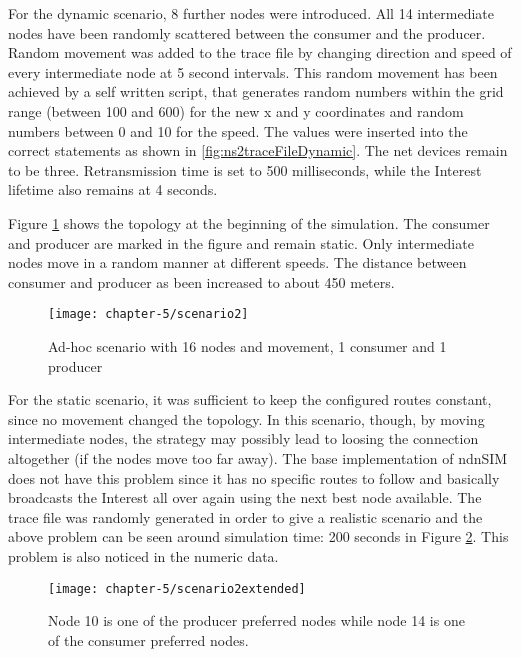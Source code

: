 For the dynamic scenario, 8 further nodes were introduced. All 14 intermediate nodes have been randomly scattered between the consumer and the producer. Random movement was added to the trace file by changing direction and speed of every intermediate node at 5 second intervals. This random movement has been achieved by a self written script, that generates random numbers within the grid range (between 100 and 600) for the new x and y coordinates and random numbers between 0 and 10 for the speed. The values were inserted into the correct statements as shown in \ref{fig:ns2traceFileDynamic}. The net devices remain to be three. Retransmission time is set to 500 milliseconds, while the Interest lifetime also remains at 4 seconds. 

Figure \ref{fig:scenario2} shows the topology at the beginning of the simulation. The consumer and producer are marked in the figure and remain static. Only intermediate nodes move in a random manner at different speeds. The distance between consumer and producer as been increased to about 450 meters.

\vspace{5mm} %

\begin{figure}[H]
  \centering
  \texttt{[image: chapter-5/scenario2]}
  \caption{Ad-hoc scenario with 16 nodes and movement, 1 consumer and 1 producer}
  \label{fig:scenario2}
\end{figure}

\vspace{5mm} %

For the static scenario, it was sufficient to keep the configured routes constant, since no movement changed the topology. In this scenario, though, by moving intermediate nodes, the strategy may possibly lead to loosing the connection altogether (if the nodes move too far away). The base implementation of ndnSIM does not have this problem since it has no specific routes to follow and basically broadcasts the Interest all over again using the next best node available. The trace file was randomly generated in order to give a realistic scenario and the above problem can be seen around simulation time: 200 seconds in Figure \ref{fig:scenario2extended}. This problem is also noticed in the numeric data.

\vspace{5mm} %

\begin{figure}[H]
  \centering
  \texttt{[image: chapter-5/scenario2extended]}
  \caption{Node 10 is one of the producer preferred nodes while node 14 is one of the consumer preferred nodes.}
  \label{fig:scenario2extended}
\end{figure}

